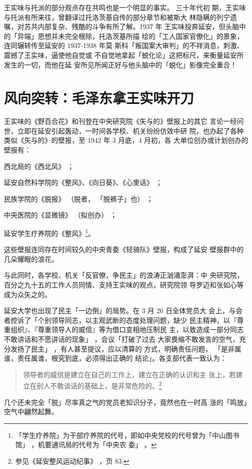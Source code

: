 王实味与托派的部分观点存在共鸣也是一个明显的事实。
三十年代初
期，王实味与托派有所来往，曾翻译过托洛茨基自传的部分章节和被斯大
林隐瞒的列宁遗嘱，对苏共内部复杂、残酷的斗争有所了解。1937 年
王实味投奔延安，但头脑中的「异端」思想并未完全根除，托洛茨基所描
绘的「工人国家官僚化」的景象，连同辗转传至延安的 1937-1938 年莫
斯科「叛国案大审判」的不祥消息，刺激、震撼了王实味，逼使他自觉或
不自觉地拿起「蜕化论」这把标尺，来衡量延安所发生的一切，而他在延
安所见所闻正好与他头脑中的「蜕化」影像完全重合！

\section{风向突转：毛泽东拿王实味开刀}
王实味的《野百合花》和刊登在中央研究院《矢与的》壁报上的其它
言论一经问世，立即在延安引起轰动，一时间各学校、机关纷纷仿效中研
院，也办起了各种类似《矢与的》的壁报，至 1942 年 3 月底，4 月初，各
大单位创办或计划创办的壁报有：

西北局的《西北风》
；

延安自然科学院的《整风》、《向日葵》、《心里话》
；

民族学院的《脱报》
（脱者，
「脱裤子」也）
；

中央医院的《显微镜》
（拟创办）
；

延安学生疗养院的《整风》\footnote{「学生疗养院」为干部疗养院的代号，即如中央党校的代号曾为「中山图书馆」
，机要通讯局的代号为「中央农
委」
。}。

这些壁报连同存在时间较久的中央青委《轻骑队》壁报，构成了延安
壁报群中的几朵耀眼的浪花。

与此同时，各学校、机关「反官僚，争民主」的浪涛正汹涌澎湃：中
央研究院，百分之九十五的工作人员同情、支持王实味的观点，研究院领
导罗迈和张如心等成为众矢之的。

延安大学也出现了民主「一边倒」的局势。在 3 月 26 日全体党员大
会上，与会者控诉了「个别领导同志，以主观武断的态度处理问题，缺少
民主精神，以『尊重组织』、『尊重领导人的威信』等为借口变相地压制民
主，以致造成一部分同志不敢讲话和不愿讲话的现象」
，会议「打破了过去
大家畏缩不敢发言的空气，充分发扬了民主」
，有人甚至提议，应以清算的
方式，明确责任问题，
「是非属谁，责任属谁，根究到底，必须得出正确的
结论」。各支部代表一致认为：
\begin{quote}
{\fzwkai 领导者的威信是建立在自己的工作上，建立在正确的认识和主
张上，若建立在别人不敢谈话的基础上，是非常危险的。\footnote{参见《延安整风运动纪事》
，页 83.}}
\end{quote}
几个还未完全「脱」尽率真之气的党员老知识分子，竟然也在一时高
涨的「鸣放」空气中翩然起舞。

